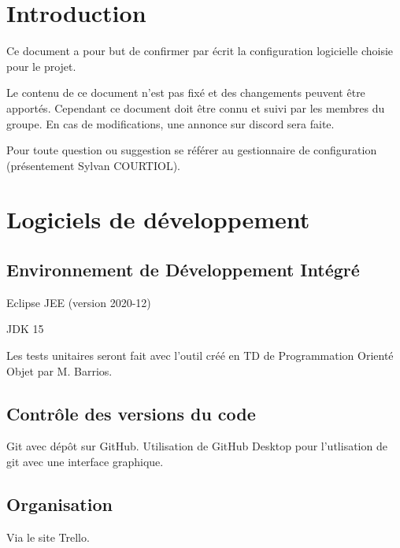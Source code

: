\documentclass[11pt,a4paper,titlepage,openright]{report}
\begin{document}
    \renewcommand{\contentsname}{Sommaire}
    \tableofcontents
    
    \newpage

    \setcounter{section}{0}
    \renewcommand{\thesection}{\arabic{section}} 
    \renewcommand{\thesubsection}{\arabic{section}.\arabic{subsection}}
    
    
    \section*{Introduction}
    \Large
    Ce document a pour but de confirmer par écrit la configuration logicielle choisie pour le
    projet.
    \par Le contenu de ce document n’est pas fixé et des changements peuvent être apportés. Cependant ce document doit être connu et suivi par les membres du groupe. En cas de modifications, une annonce sur discord sera faite.
    \par Pour toute question ou suggestion se référer au gestionnaire de configuration (présentement
    Sylvan COURTIOL).


    \normalsize
    \section{Logiciels de développement}
        \subsection{Environnement de Développement Intégré}
        Eclipse JEE (version 2020-12)
        \par JDK 15
        \par Les tests unitaires seront fait avec l'outil créé en TD de Programmation Orienté Objet par M. Barrios.
        
        \subsection{Contrôle des versions du code}
        Git avec dépôt sur GitHub. Utilisation de GitHub Desktop pour l'utlisation de git avec une interface graphique.
        
        \subsection{Organisation}
        Via le site Trello.
        
\end{document}
